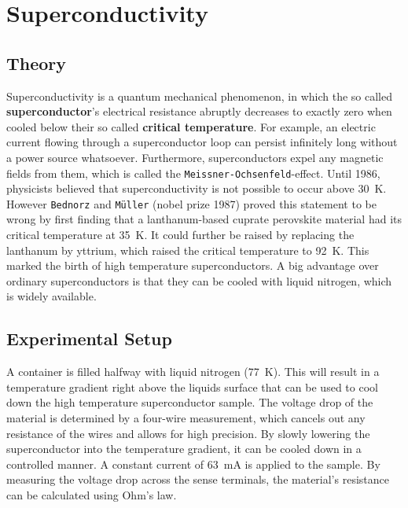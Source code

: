 \chapter{Superconductivity}
\section{Theory}
Superconductivity is a quantum mechanical phenomenon, in which the so called \textbf{superconductor}'s electrical resistance abruptly decreases to exactly zero when cooled below their so called \textbf{critical temperature}.
For example, an electric current flowing through a superconductor loop can persist infinitely long without a power source whatsoever.
Furthermore, superconductors expel any magnetic fields from them, which is called the \texttt{Meissner-Ochsenfeld}-effect.
Until 1986, physicists believed that superconductivity is not possible to occur above \SI{30}{\kelvin}.
However \texttt{Bednorz} and \texttt{Müller} (nobel prize 1987) proved this statement to be wrong by first finding that a lanthanum-based cuprate perovskite material had its critical temperature at \SI{35}{\kelvin}.
It could further be raised by replacing the lanthanum by yttrium, which raised the critical temperature to \SI{92}{\kelvin}\cite{PhysRevLett.58.908}.
This marked the birth of high temperature superconductors.
A big advantage over ordinary superconductors is that they can be cooled with liquid nitrogen, which is widely available.

\section{Experimental Setup}
A container is filled halfway with liquid nitrogen (\SI{77}{\kelvin}).
This will result in a temperature gradient right above the liquids surface that can be used to cool down the high temperature superconductor sample.
The voltage drop of the material is determined by a four-wire measurement, which cancels out any resistance of the wires and allows for high precision.
By slowly lowering the superconductor into the temperature gradient, it can be cooled down in a controlled manner.
A constant current of \SI{63}{\mA} is applied to the sample.
By measuring the voltage drop across the sense terminals, the material's resistance can be calculated using Ohm's law.

